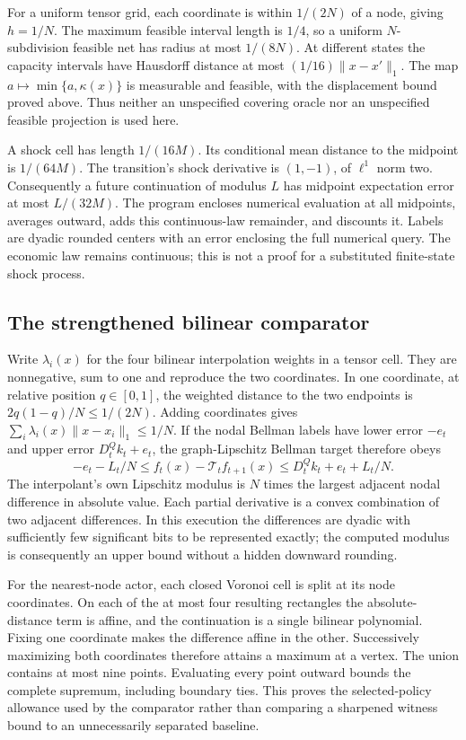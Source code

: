 For a uniform tensor grid, each coordinate is within $1/(2N)$ of a node, giving $h=1/N$. The maximum feasible interval length is $1/4$, so a uniform $N$-subdivision feasible net has radius at most $1/(8N)$. At different states the capacity intervals have Hausdorff distance at most $(1/16)\|x-x'\|_1$. The map $a\mapsto\min\{a,\kappa(x)\}$ is measurable and feasible, with the displacement bound proved above. Thus neither an unspecified covering oracle nor an unspecified feasible projection is used here.

A shock cell has length $1/(16M)$. Its conditional mean distance to the midpoint is $1/(64M)$. The transition's shock derivative is $(1,-1)$, of $\ell^1$ norm two. Consequently a future continuation of modulus $L$ has midpoint expectation error at most $L/(32M)$. The program encloses numerical evaluation at all midpoints, averages outward, adds this continuous-law remainder, and discounts it. Labels are dyadic rounded centers with an error enclosing the full numerical query. The economic law remains continuous; this is not a proof for a substituted finite-state shock process.

\subsection{The strengthened bilinear comparator}
Write $\lambda_i(x)$ for the four bilinear interpolation weights in a tensor cell. They are nonnegative, sum to one and reproduce the two coordinates. In one coordinate, at relative position $q\in[0,1]$, the weighted distance to the two endpoints is $2q(1-q)/N\le1/(2N)$. Adding coordinates gives $\sum_i\lambda_i(x)\|x-x_i\|_1\le1/N$. If the nodal Bellman labels have lower error $-e_t$ and upper error $D_t^Qk_t+e_t$, the graph-Lipschitz Bellman target therefore obeys
\[
 -e_t-L_t/N\le f_t(x)-\mathcal T_tf_{t+1}(x)
 \le D_t^Qk_t+e_t+L_t/N.
\]
The interpolant's own Lipschitz modulus is $N$ times the largest adjacent nodal difference in absolute value. Each partial derivative is a convex combination of two adjacent differences. In this execution the differences are dyadic with sufficiently few significant bits to be represented exactly; the computed modulus is consequently an upper bound without a hidden downward rounding.

For the nearest-node actor, each closed Voronoi cell is split at its node coordinates. On each of the at most four resulting rectangles the absolute-distance term is affine, and the continuation is a single bilinear polynomial. Fixing one coordinate makes the difference affine in the other. Successively maximizing both coordinates therefore attains a maximum at a vertex. The union contains at most nine points. Evaluating every point outward bounds the complete supremum, including boundary ties. This proves the selected-policy allowance used by the comparator rather than comparing a sharpened witness bound to an unnecessarily separated baseline.


